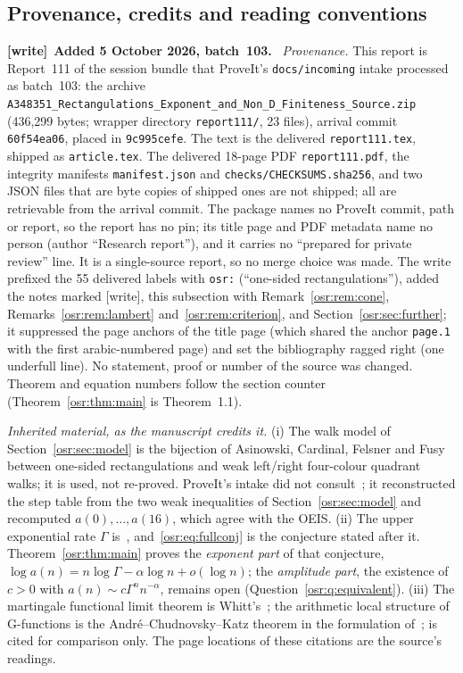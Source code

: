 \documentclass[11pt,letterpaper]{article}
\newcommand{\G}{\Gamma}\newcommand{\s}{\sqrt{17}}
\numberwithin{equation}{section}
\newenvironment{writenote}[1][]{\par\smallskip\begingroup\small
 \noindent\textbf{[write]}\if\relax\detokenize{#1}\relax\else~\textbf{#1.}\fi\ }%
 {\par\endgroup\smallskip}
\begin{document}
\subsection{Provenance, credits and reading conventions}\label{osr:sec:provenance}
\begin{writenote}[Added 5 October 2026, batch~103]
\emph{Provenance.} This report is Report~111 of the session bundle that
ProveIt's \nolinkurl{docs/incoming} intake processed as batch~103: the archive
\nolinkurl{A348351_Rectangulations_Exponent_and_Non_D_Finiteness_Source.zip}
(436{,}299 bytes; wrapper directory \nolinkurl{report111/}, 23 files),
arrival commit \nolinkurl{60f54ea06}, placed in \nolinkurl{9c995cefe}. The
text is the delivered \nolinkurl{report111.tex}, shipped as
\nolinkurl{article.tex}. The delivered 18-page PDF \nolinkurl{report111.pdf},
the integrity manifests \nolinkurl{manifest.json} and
\nolinkurl{checks/CHECKSUMS.sha256}, and two JSON files that are byte copies
of shipped ones are not shipped; all are retrievable from the arrival commit.
The package names no ProveIt commit, path or report, so the report has no
pin; its title page and PDF metadata name no person (author ``Research
report''), and it carries no ``prepared for private review'' line. It is a
single-source report, so no merge choice was made. The write prefixed the 55
delivered labels with \nolinkurl{osr:} (``one-sided rectangulations''), added
the notes marked [write], this subsection with
Remark~\ref{osr:rem:cone}, Remarks~\ref{osr:rem:lambert}
and~\ref{osr:rem:criterion}, and Section~\ref{osr:sec:further}; it
suppressed the page anchors of the title page (which shared the anchor
\nolinkurl{page.1} with the first arabic-numbered page) and set the bibliography ragged right (one underfull line). No
statement, proof or number of the source was changed. Theorem and equation
numbers follow the section counter (Theorem~\ref{osr:thm:main} is
Theorem~1.1).

\emph{Inherited material, as the manuscript credits it.} (i) The walk model
of Section~\ref{osr:sec:model} is the bijection of Asinowski, Cardinal,
Felsner and Fusy~\cite[Section~4.6, Figure~4.16]{rect} between one-sided
rectangulations and weak left/right four-colour quadrant walks; it is used,
not re-proved. ProveIt's intake did not consult~\cite{rect}; it
reconstructed the step table from the two weak inequalities of
Section~\ref{osr:sec:model} and recomputed $a(0),\dots,a(16)$, which agree
with the OEIS. (ii) The upper exponential rate $\G$ is~\cite[Proposition
4.23]{rect}, and~\eqref{osr:eq:fullconj} is the conjecture stated after it.
Theorem~\ref{osr:thm:main} proves the \emph{exponent part} of that
conjecture, $\log a(n)=n\log\G-\alpha\log n+o(\log n)$; the \emph{amplitude
part}, the existence of $c>0$ with $a(n)\sim c\G^nn^{-\alpha}$, remains open
(Question~\ref{osr:q:equivalent}). (iii) The martingale functional limit
theorem is Whitt's~\cite{whitt}; the arithmetic local structure of
G-functions is the Andr\'e--Chudnovsky--Katz theorem in the formulation
of~\cite{FR}; \cite{BRS} is cited for comparison only. The page locations
of these citations are the source's readings.


\end{writenote}
\end{document}
